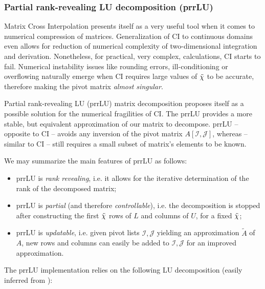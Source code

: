\subsubsection{Partial rank-revealing LU decomposition (prrLU)}
Matrix Cross Interpolation presents itself as a very useful tool when it comes to numerical compression of matrices. Generalization of CI to continuous domains \cite{Schneider2010, Fernandez2022} even allows for reduction of numerical complexity of two-dimensional integration and derivation. Nonetheless, for practical, very complex, calculations, CI starts to fail. Numerical instability issues like rounding errors, ill-conditioning or overflowing \cite{Golub96} naturally emerge when CI requires large values of ${\tilde \chi}$ to be accurate, therefore making the pivot matrix \textit{almost singular}. 

Partial rank-revealing LU (prrLU) \cite{Golub96, Pan2000} matrix decomposition proposes itself as a possible solution for the numerical fragilities of CI. The prrLU provides a more stable, but equivalent approximation of our matrix to decompose. prrLU -- opposite to CI -- avoids any inversion of the pivot matrix $A[\mathcal{I}, \mathcal{J}]$, whereas -- similar to CI -- still requires a small subset of matrix's elements to be known. 

We may summarize the main features of prrLU as follows:

\begin{itemize}
	\item prrLU is \textit{rank revealing}, i.e. it allows for the iterative determination of the rank of the decomposed matrix;
	\item prrLU is \textit{partial} (and therefore \textit{controllable}), i.e. the decomposition is stopped after constructing the first ${\tilde \chi}$ rows of $L$ and columns of $U$, for a fixed ${\tilde \chi}$;
	\item prrLU is \textit{updatable}, i.e. given pivot lists $\mathcal{I}, \mathcal{J}$ yielding an approximation $\tilde{A}$ of $A$, new rows and columns can easily be added to $\mathcal{I}, \mathcal{J}$ for an improved approximation. 
\end{itemize}

The prrLU implementation relies on the following LU decomposition (easily inferred from ):

